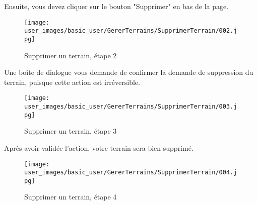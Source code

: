 Ensuite, vous devez cliquer sur le bouton "Supprimer" en bas de la page.

\begin{figure}[H]
\centering
\texttt{[image: user\_images/basic\_user/GererTerrains/SupprimerTerrain/002.jpg]}
\caption{Supprimer un terrain, étape 2}
\end{figure}

Une boîte de dialogue vous demande de confirmer la demande de suppression du terrain, puisque cette action est irréversible.

\begin{figure}[H]
\centering
\texttt{[image: user\_images/basic\_user/GererTerrains/SupprimerTerrain/003.jpg]}
\caption{Supprimer un terrain, étape 3}
\end{figure}

Après avoir validée l'action, votre terrain sera bien supprimé.

\begin{figure}[H]
\centering
\texttt{[image: user\_images/basic\_user/GererTerrains/SupprimerTerrain/004.jpg]}
\caption{Supprimer un terrain, étape 4}
\end{figure}
